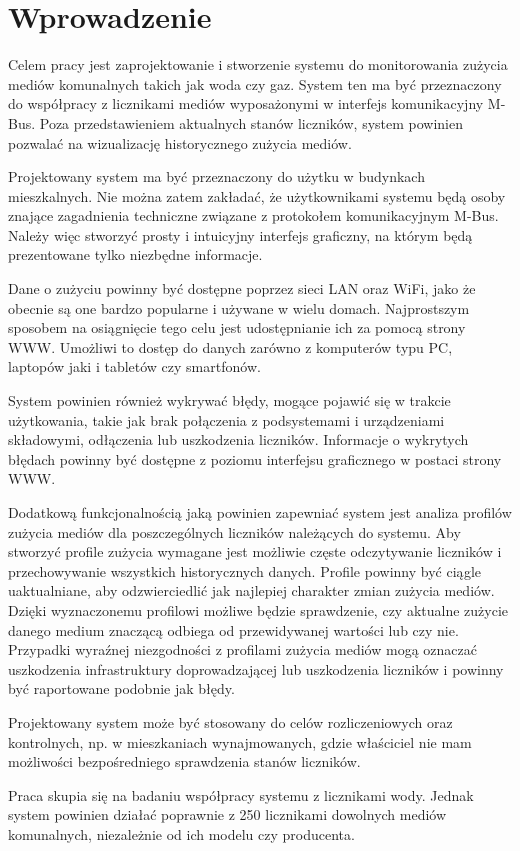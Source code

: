 \chapter{Wprowadzenie} %
\label{cha:wprowadzenie}

Celem pracy jest zaprojektowanie i stworzenie systemu do monitorowania zużycia mediów komunalnych takich jak woda czy gaz.
System ten ma być przeznaczony do współpracy z licznikami mediów wyposażonymi w interfejs komunikacyjny M-Bus.
Poza przedstawieniem aktualnych stanów liczników, system powinien pozwalać na wizualizację historycznego zużycia mediów.

Projektowany system ma być przeznaczony do użytku w budynkach mieszkalnych.
Nie można zatem zakładać, że użytkownikami systemu będą osoby znające zagadnienia techniczne związane z protokołem komunikacyjnym M-Bus.
Należy więc stworzyć prosty i intuicyjny interfejs graficzny, na którym będą prezentowane tylko niezbędne informacje.

Dane o zużyciu powinny być dostępne poprzez sieci LAN oraz WiFi, jako że obecnie są one bardzo popularne i używane w wielu domach.
Najprostszym sposobem na osiągnięcie tego celu jest udostępnianie ich za pomocą strony WWW.
Umożliwi to dostęp do danych zarówno z komputerów typu PC, laptopów jaki i tabletów czy smartfonów.

System powinien również wykrywać błędy, mogące pojawić się w trakcie użytkowania, takie jak brak połączenia z podsystemami i urządzeniami składowymi, odłączenia lub uszkodzenia liczników.
Informacje o wykrytych błędach powinny być dostępne z poziomu interfejsu graficznego w postaci strony WWW.

Dodatkową funkcjonalnością jaką powinien zapewniać system jest analiza profilów zużycia mediów dla poszczególnych liczników należących do systemu.
Aby stworzyć profile zużycia wymagane jest możliwie częste odczytywanie liczników i przechowywanie wszystkich historycznych danych.
Profile powinny być ciągle uaktualniane, aby odzwierciedlić jak najlepiej charakter zmian zużycia mediów.
Dzięki wyznaczonemu profilowi możliwe będzie sprawdzenie, czy aktualne zużycie danego medium znaczącą odbiega od przewidywanej wartości lub czy nie.
Przypadki wyraźnej niezgodności z profilami zużycia mediów mogą oznaczać uszkodzenia infrastruktury doprowadzającej lub uszkodzenia liczników i powinny być raportowane podobnie jak błędy.

Projektowany system może być stosowany do celów rozliczeniowych oraz kontrolnych, np. w mieszkaniach wynajmowanych, gdzie właściciel nie mam możliwości bezpośredniego sprawdzenia stanów liczników.

Praca skupia się na badaniu współpracy systemu z licznikami wody.
Jednak system powinien działać poprawnie z 250 licznikami dowolnych mediów komunalnych, niezależnie od ich modelu czy producenta.
